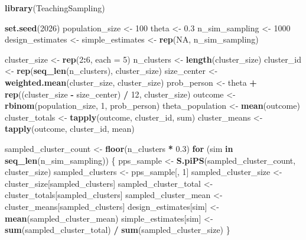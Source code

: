 \documentclass[
  spanish,
  12pt,
]{book}
\newenvironment{Shaded}{\begin{snugshade}}{\end{snugshade}}
\newcommand{\AttributeTok}[1]{\textcolor[rgb]{0.13,0.29,0.53}{#1}}
\newcommand{\ConstantTok}[1]{\textcolor[rgb]{0.56,0.35,0.01}{#1}}
\newcommand{\ControlFlowTok}[1]{\textcolor[rgb]{0.13,0.29,0.53}{\textbf{#1}}}
\newcommand{\DecValTok}[1]{\textcolor[rgb]{0.00,0.00,0.81}{#1}}
\newcommand{\FloatTok}[1]{\textcolor[rgb]{0.00,0.00,0.81}{#1}}
\newcommand{\FunctionTok}[1]{\textcolor[rgb]{0.13,0.29,0.53}{\textbf{#1}}}
\newcommand{\NormalTok}[1]{#1}
\newcommand{\OtherTok}[1]{\textcolor[rgb]{0.56,0.35,0.01}{#1}}
\newcommand{\SpecialCharTok}[1]{\textcolor[rgb]{0.81,0.36,0.00}{\textbf{#1}}}
\begin{document}
\begin{Shaded}
\begin{Highlighting}[]
\FunctionTok{library}\NormalTok{(TeachingSampling)}

\FunctionTok{set.seed}\NormalTok{(}\DecValTok{2026}\NormalTok{)}
\NormalTok{population\_size }\OtherTok{\textless{}{-}} \DecValTok{100}
\NormalTok{theta }\OtherTok{\textless{}{-}} \FloatTok{0.3}
\NormalTok{n\_sim\_sampling }\OtherTok{\textless{}{-}} \DecValTok{1000}
\NormalTok{design\_estimates }\OtherTok{\textless{}{-}}\NormalTok{ simple\_estimates }\OtherTok{\textless{}{-}} \FunctionTok{rep}\NormalTok{(}\ConstantTok{NA}\NormalTok{, n\_sim\_sampling)}

\NormalTok{cluster\_size }\OtherTok{\textless{}{-}} \FunctionTok{rep}\NormalTok{(}\DecValTok{2}\SpecialCharTok{:}\DecValTok{6}\NormalTok{, }\AttributeTok{each =} \DecValTok{5}\NormalTok{)}
\NormalTok{n\_clusters }\OtherTok{\textless{}{-}} \FunctionTok{length}\NormalTok{(cluster\_size)}
\NormalTok{cluster\_id }\OtherTok{\textless{}{-}} \FunctionTok{rep}\NormalTok{(}\FunctionTok{seq\_len}\NormalTok{(n\_clusters), cluster\_size)}
\NormalTok{size\_center }\OtherTok{\textless{}{-}} \FunctionTok{weighted.mean}\NormalTok{(cluster\_size, cluster\_size)}
\NormalTok{prob\_person }\OtherTok{\textless{}{-}}\NormalTok{ theta }\SpecialCharTok{+} \FunctionTok{rep}\NormalTok{((cluster\_size }\SpecialCharTok{{-}}\NormalTok{ size\_center) }\SpecialCharTok{/} \DecValTok{12}\NormalTok{, cluster\_size)}
\NormalTok{outcome }\OtherTok{\textless{}{-}} \FunctionTok{rbinom}\NormalTok{(population\_size, }\DecValTok{1}\NormalTok{, prob\_person)}
\NormalTok{theta\_population }\OtherTok{\textless{}{-}} \FunctionTok{mean}\NormalTok{(outcome)}
\NormalTok{cluster\_totals }\OtherTok{\textless{}{-}} \FunctionTok{tapply}\NormalTok{(outcome, cluster\_id, sum)}
\NormalTok{cluster\_means }\OtherTok{\textless{}{-}} \FunctionTok{tapply}\NormalTok{(outcome, cluster\_id, mean)}

\NormalTok{sampled\_cluster\_count }\OtherTok{\textless{}{-}} \FunctionTok{floor}\NormalTok{(n\_clusters }\SpecialCharTok{*} \FloatTok{0.3}\NormalTok{)}
\ControlFlowTok{for}\NormalTok{ (sim }\ControlFlowTok{in} \FunctionTok{seq\_len}\NormalTok{(n\_sim\_sampling)) \{}
\NormalTok{  pps\_sample }\OtherTok{\textless{}{-}} \FunctionTok{S.piPS}\NormalTok{(sampled\_cluster\_count, cluster\_size)}
\NormalTok{  sampled\_clusters }\OtherTok{\textless{}{-}}\NormalTok{ pps\_sample[, }\DecValTok{1}\NormalTok{]}
\NormalTok{  sampled\_cluster\_size }\OtherTok{\textless{}{-}}\NormalTok{ cluster\_size[sampled\_clusters]}
\NormalTok{  sampled\_cluster\_total }\OtherTok{\textless{}{-}}\NormalTok{ cluster\_totals[sampled\_clusters]}
\NormalTok{  sampled\_cluster\_mean }\OtherTok{\textless{}{-}}\NormalTok{ cluster\_means[sampled\_clusters]}
\NormalTok{  design\_estimates[sim] }\OtherTok{\textless{}{-}} \FunctionTok{mean}\NormalTok{(sampled\_cluster\_mean)}
\NormalTok{  simple\_estimates[sim] }\OtherTok{\textless{}{-}}
    \FunctionTok{sum}\NormalTok{(sampled\_cluster\_total) }\SpecialCharTok{/} \FunctionTok{sum}\NormalTok{(sampled\_cluster\_size)}
\NormalTok{\}}


\end{Highlighting}
\end{Shaded}
\end{document}
